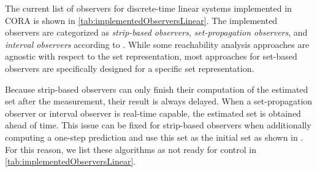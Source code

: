 
The current list of observers for discrete-time linear systems implemented in CORA is shown in \cref{tab:implementedObserversLinear}. The implemented observers are categorized as \textit{strip-based observers}, \textit{set-propagation observers}, and \textit{interval observers} according to \cite{Althoff2021c,Althoff2021d}. While some reachability analysis approaches are agnostic with respect to the set representation, most approaches for set-based observers are specifically designed for a specific set representation.

Because strip-based observers can only finish their computation of the estimated set after the measurement, their result is always delayed. When a set-propagation observer or interval observer is real-time capable, the estimated set is obtained ahead of time. This issue can be fixed for strip-based observers when additionally computing a one-step prediction and use this set as the initial set as shown in \cite[Sec.~III]{Schuermann2018a}. For this reason, we list these algorithms as not ready for control in \cref{tab:implementedObserversLinear}.

